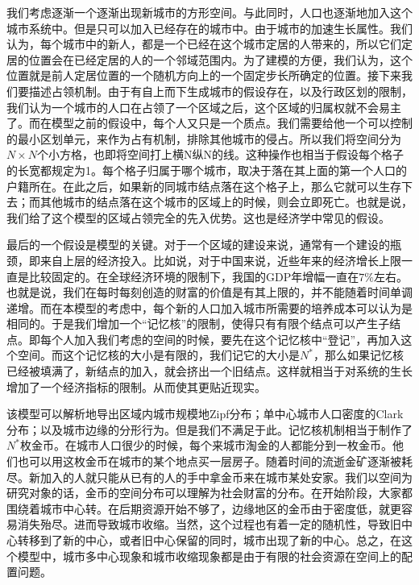我们考虑逐渐一个逐渐出现新城市的方形空间。与此同时，人口也逐渐地加入这个城市系统中。但是只可以加入已经存在的城市中。由于城市的加速生长属性。我们认为，每个城市中的新人，都是一个已经在这个城市定居的人带来的，所以它们定居的位置会在已经定居的人的一个邻域范围内。为了建模的方便，我们认为，这个位置就是前人定居位置的一个随机方向上的一个固定步长所确定的位置。接下来我们要描述占领机制。由于有自上而下生成城市的假设存在，以及行政区划的限制，我们认为一个城市的人口在占领了一个区域之后，这个区域的归属权就不会易主了。而在模型之前的假设中，每个人又只是一个质点。我们需要给他一个可以控制的最小区划单元，来作为占有机制，排除其他城市的侵占。所以我们将空间分为$N\times N$个小方格，也即将空间打上横N纵N的线。这种操作也相当于假设每个格子的长宽都规定为1。每个格子归属于哪个城市，取决于落在其上面的第一个人口的户籍所在。在此之后，如果新的同城市结点落在这个格子上，那么它就可以生存下去；而其他城市的结点落在这个城市的区域上的时候，则会立即死亡。也就是说，我们给了这个模型的区域占领完全的先入优势。这也是经济学中常见的假设。

最后的一个假设是模型的关键。对于一个区域的建设来说，通常有一个建设的瓶颈，即来自上层的经济投入。比如说，对于中国来说，近些年来的经济增长上限一直是比较固定的。在全球经济环境的限制下，我国的GDP年增幅一直在$7\%$左右。也就是说，我们在每时每刻创造的财富的价值是有其上限的，并不能随着时间单调递增。而在本模型的考虑中，每个新的人口加入城市所需要的培养成本可以认为是相同的。于是我们增加一个“记忆核”的限制，使得只有有限个结点可以产生子结点。即每个人加入我们考虑的空间的时候，要先在这个记忆核中“登记”，再加入这个空间。而这个记忆核的大小是有限的，我们记它的大小是$N^*$，那么如果记忆核已经被填满了，新结点的加入，就会挤出一个旧结点。这样就相当于对系统的生长增加了一个经济指标的限制。从而使其更贴近现实。

该模型可以解析地导出区域内城市规模地Zipf分布；单中心城市人口密度的Clark分布；以及城市边缘的分形行为。但是我们不满足于此。记忆核机制相当于制作了$N^*$枚金币。在城市人口很少的时候，每个来城市淘金的人都能分到一枚金币。他们也可以用这枚金币在城市的某个地点买一层房子。随着时间的流逝金矿逐渐被耗尽。新加入的人就只能从已有的人的手中拿金币来在城市某处安家。我们以空间为研究对象的话，金币的空间分布可以理解为社会财富的分布。在开始阶段，大家都围绕着城市中心转。在后期资源开始不够了，边缘地区的金币由于密度低，就更容易消失殆尽。进而导致城市收缩。当然，这个过程也有着一定的随机性，导致旧中心转移到了新的中心，或者旧中心保留的同时，城市出现了新的中心。总之，在这个模型中，城市多中心现象和城市收缩现象都是由于有限的社会资源在空间上的配置问题。